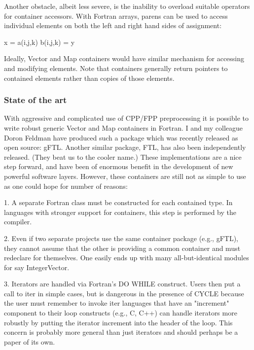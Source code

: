 \documentclass{article}
\begin{document}
Another obstacle, albeit less severe, is the inability to overload
suitable operators for container accessors.  With Fortran arrays,
parens can be used to access individual elements on both the left and
right hand sides of assignment:

      x = a(i,j,k)
      b(i,j,k) = y


Ideally, Vector and Map containers would have similar mechanism for
accessing and modifying elements.  Note that containers generally
return pointers to contained elements rather than copies of those
elements.


\subsubsection{State of the art}

With aggressive and complicated use of CPP/FPP preprocessing it is
possible to write robust generic Vector and Map containers in Fortran.
I and my colleague Doron Feldman have produced such a package which
was recently released as open source: gFTL.  Another similar package,
FTL, has also been independently released.  (They beat us to the
cooler name.)  These implementations are a nice step forward, and have
been of enormous benefit in the development of new powerful software
layers.  However, these containers are still not as simple to use as
one could hope for number of reasons:

1. A separate Fortran class must be constructed for each contained
   type.  In languages with stronger support for containers, this step
   is performed by the compiler.

2. Even if two separate projects use the same container package (e.g.,
   gFTL), they cannot assume that the other is providing a common
   container and must redeclare for themselves.  One easily ends up
   with many all-but-identical modules for say IntegerVector.

3. Iterators are handled via Fortran's DO WHILE construct.  Users then
   put a call to iter%
   in simple cases, but is dangerous in the presence of CYCLE because
   the user must remember to invoke iter%
   languages that have an "increment" component to their loop
   constructs (e.g., C, C++) can handle iterators more robustly by
   putting the iterator increment into the header of the loop.  This
   concern is probably more general than just iterators and should
   perhaps be a paper of its own.
\end{document}
